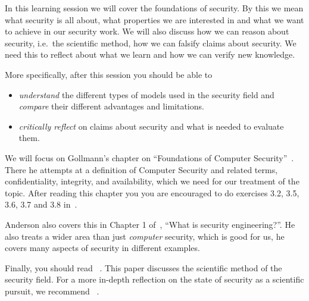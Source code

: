 In this learning session we will cover the foundations of security.
By this we mean what security is all about, \eg what properties we are 
interested in and what we want to achieve in our security work.
We will also discuss how we can reason about security, i.e.\ the scientific 
method, how we can falsify claims about security.
We need this to reflect about what we learn and how we can verify new 
knowledge.

More specifically, after this session you should be able to
\begin{itemize}
  \item \emph{understand} the different types of models used in the security 
    field and \emph{compare} their different advantages and limitations.
  \item \emph{critically reflect} on claims about security and what is needed 
    to evaluate them.
\end{itemize}

We will focus on Gollmann's chapter on \enquote{Foundations of Computer 
  Security}~\cite[Chap.\ 3]{Gollmann2011cs}.
There he attempts at a definition of Computer Security and related terms, \eg 
confidentiality, integrity, and availability, which we need for our treatment 
of the topic.
After reading this chapter you you are encouraged to do exercises 3.2, 3.5, 
3.6, 3.7 and 3.8 in~\cite{Gollmann2011cs}.

Anderson also covers this in Chapter 1 of~\cite{Anderson2008sea}, \enquote{What 
  is security engineering?}.
He also treats a wider area than just \emph{computer} security, which is good 
for us, he covers many aspects of security in different examples.

Finally, you should read 
~\cite{HowToDesignSecurityExperiments}.
This paper discusses the scientific method of the security field.
For a more in-depth reflection on the state of security as a scientific 
pursuit, we recommend ~\cite{SecurityAsAScience}.

